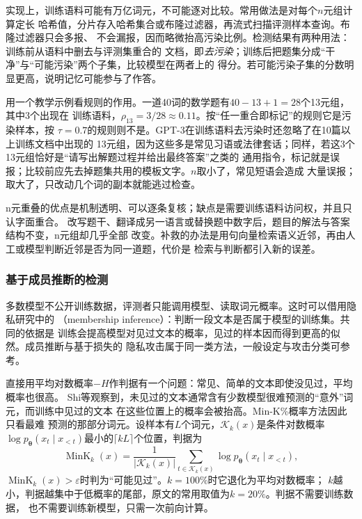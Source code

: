 实现上，训练语料可能有万亿词元，不可能逐对比较。常用做法是对每个$n$元组计算定长
哈希值，分片存入哈希集合或布隆过滤器，再流式扫描评测样本查询。布隆过滤器只会多报、
不会漏报，因而略微抬高污染比例。检测结果有两种用法：训练前从语料中删去与评测集重合的
文档，即\emph{去污染}；训练后把题集分成“干净”与“可能污染”两个子集，比较模型在两者上的
得分。若可能污染子集的分数明显更高，说明记忆可能参与了作答。

用一个教学示例看规则的作用。一道40词的数学题有$40-13+1=28$个13元组，其中3个出现在
训练语料，$\rho_{13}=3/28\approx0.11$。按“任一重合即标记”的规则它是污染样本，按
$\tau=0.7$的规则则不是。GPT-3在训练语料去污染时还忽略了在10篇以上训练文档中出现的
13元组，因为这些多是常见习语或法律套话\cite{brown2020}；同样，若这3个13元组恰好是“请写出解题过程并给出最终答案”之类的
通用指令，标记就是误报；比较前应先去掉题集共用的模板文字。$n$取小了，常见短语会造成
大量误报；取大了，只改动几个词的副本就能逃过检查。

n元重叠的优点是机制透明、可以逐条复核；缺点是需要训练语料访问权，并且只认字面重合。
改写题干、翻译成另一语言或替换题中数字后，题目的解法与答案结构不变，n元组却几乎全部
改变。补救的办法是用句向量检索语义近邻，再由人工或模型判断近邻是否为同一道题，代价是
检索与判断都引入新的误差。

\subsubsection{基于成员推断的检测}
\label{sec:nlp-eval-membership}

多数模型不公开训练数据，评测者只能调用模型、读取词元概率。这时可以借用隐私研究中的
（membership inference）：判断一段文本是否属于模型的训练集。共同的依据是
训练会提高模型对见过文本的概率，见过的样本因而得到更高的似然。成员推断与基于损失的
隐私攻击属于同一类方法，一般设定与攻击分类可参考。

直接用平均对数概率$-H$作判据有一个问题：常见、简单的文本即使没见过，平均概率也很高。
Shi等观察到，未见过的文本通常含有少数模型很难预测的“意外”词元，而训练中见过的文本
在这些位置上的概率会被抬高。Min-K\%概率方法因此只看最难
预测的那部分词元。设样本有$L$个词元，$\mathcal K_k(x)$是条件对数概率
$\log p_{\bm\theta}(x_t\mid x_{<t})$最小的$\lceil kL\rceil$个位置，判据为
\begin{equation}
 \operatorname{MinK}_k(x)
 =\frac{1}{|\mathcal K_k(x)|}\sum_{t\in\mathcal K_k(x)}
 \log p_{\bm\theta}(x_t\mid x_{<t}),
 \label{eq:nlp-eval-mink}
\end{equation}
$\operatorname{MinK}_k(x)>\varepsilon$时判为“可能见过”。$k=100\%$时它退化为平均对数概率；
$k$越小，判据越集中于低概率的尾部，原文的常用取值为$k=20\%$。判据不需要训练数据，
也不需要训练新模型，只需一次前向计算。

